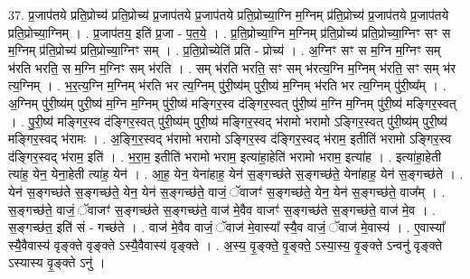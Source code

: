\documentclass[17pt]{extarticle}
\begin{document}
37. प्र॒जाप॑तये प्रति॒प्रोच्य॑ प्रति॒प्रोच्य॑ प्र॒जाप॑तये प्र॒जाप॑तये प्रति॒प्रोच्या॒ग्नि म॒ग्निम् प्र॑ति॒प्रोच्य॑ प्र॒जाप॑तये प्र॒जाप॑तये प्रति॒प्रोच्या॒ग्निम् । . प्र॒जाप॑तय॒ इति॑ प्र॒जा - प॒त॒ये॒ । . प्र॒ति॒प्रोच्या॒ग्नि म॒ग्निम् प्र॑ति॒प्रोच्य॑ प्रति॒प्रोच्या॒ग्निꣳ सꣳ स म॒ग्निम् प्र॑ति॒प्रोच्य॑ प्रति॒प्रोच्या॒ग्निꣳ सम् । . प्र॒ति॒प्रोच्येति॑ प्रति - प्रोच्य॑ । . अ॒ग्निꣳ सꣳ स म॒ग्नि म॒ग्निꣳ सम् भ॑रति भरति॒ स म॒ग्नि म॒ग्निꣳ सम् भ॑रति । . सम् भ॑रति भरति॒ सꣳ सम् भ॑रत्य॒ग्नि म॒ग्निम् भ॑रति॒ सꣳ सम् भ॑र त्य॒ग्निम् । . भ॒र॒त्य॒ग्नि म॒ग्निम् भ॑रति भर त्य॒ग्निम् पु॑री॒ष्य॑म् पुरी॒ष्य॑ म॒ग्निम् भ॑रति भर त्य॒ग्निम् पु॑री॒ष्य᳚म् । . अ॒ग्निम् पु॑री॒ष्य॑म् पुरी॒ष्य॑ म॒ग्नि म॒ग्निम् पु॑री॒ष्य॑ मङ्गिर॒स्व द॑ङ्गिर॒स्वत् पु॑री॒ष्य॑ म॒ग्नि म॒ग्निम् पु॑री॒ष्य॑ मङ्गिर॒स्वत् । . पु॒री॒ष्य॑ मङ्गिर॒स्व द॑ङ्गिर॒स्वत् पु॑री॒ष्य॑म् पुरी॒ष्य॑ मङ्गिर॒स्वद् भ॑रामो भरामो ऽङ्गिर॒स्वत् पु॑री॒ष्य॑म् पुरी॒ष्य॑ मङ्गिर॒स्वद् भ॑रामः । . अ॒ङ्गि॒र॒स्वद् भ॑रामो भरामो ऽङ्गिर॒स्व द॑ङ्गिर॒स्वद् भ॑राम॒ इतीति॑ भरामो ऽङ्गिर॒स्व द॑ङ्गिर॒स्वद् भ॑राम॒ इति॑ । . भ॒रा॒म॒ इतीति॑ भरामो भराम॒ इत्या॑हा॒हेति॑ भरामो भराम॒ इत्या॑ह । . इत्या॑हा॒हेती त्या॑ह॒ येन॒ येना॒हेती त्या॑ह॒ येन॑ । . आ॒ह॒ येन॒ येना॑हाह॒ येन॑ स॒ङ्गच्छ॑ते स॒ङ्गच्छ॑ते॒ येना॑हाह॒ येन॑ स॒ङ्गच्छ॑ते । . येन॑ स॒ङ्गच्छ॑ते स॒ङ्गच्छ॑ते॒ येन॒ येन॑ स॒ङ्गच्छ॑ते॒ वाजं॒ ॅवाजꣳ॑ स॒ङ्गच्छ॑ते॒ येन॒ येन॑ स॒ङ्गच्छ॑ते॒ वाज᳚म् । . स॒ङ्गच्छ॑ते॒ वाजं॒ ॅवाजꣳ॑ स॒ङ्गच्छ॑ते स॒ङ्गच्छ॑ते॒ वाज॑ मे॒वैव वाजꣳ॑ स॒ङ्गच्छ॑ते स॒ङ्गच्छ॑ते॒ वाज॑ मे॒व । . स॒ङ्गच्छ॑त॒ इति॑ सं - गच्छ॑ते । . वाज॑ मे॒वैव वाजं॒ ॅवाज॑ मे॒वास्या᳚ स्यै॒व वाजं॒ ॅवाज॑ मे॒वास्य॑ । . ए॒वास्या᳚ स्यै॒वैवास्य॑ वृङ्क्ते वृङ्क्ते ऽस्यै॒वैवास्य॑ वृङ्क्ते । . अ॒स्य॒ वृ॒ङ्क्ते॒ वृ॒ङ्क्ते॒ ऽस्या॒स्य॒ वृ॒ङ्क्ते ऽन्वनु॑ वृङ्क्ते ऽस्यास्य वृ॒ङ्क्ते ऽनु॑ । \newline
\end{document}
